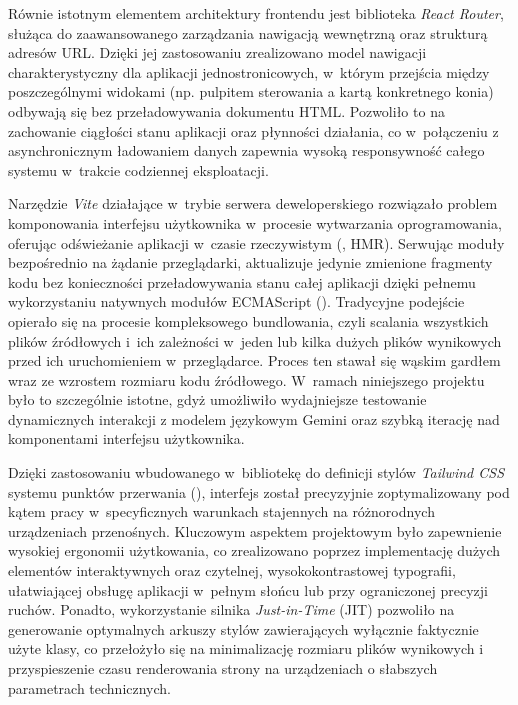 Równie istotnym elementem architektury frontendu jest biblioteka \textit{React Router}, służąca do zaawansowanego zarządzania nawigacją wewnętrzną oraz strukturą adresów URL. Dzięki jej zastosowaniu zrealizowano model nawigacji charakterystyczny dla aplikacji jednostronicowych, w~którym przejścia między poszczególnymi widokami (np. pulpitem sterowania a kartą konkretnego konia) odbywają się bez przeładowywania dokumentu HTML. Pozwoliło to na zachowanie ciągłości stanu aplikacji oraz płynności działania, co w~połączeniu z asynchronicznym ładowaniem danych zapewnia wysoką responsywność całego systemu w~trakcie codziennej eksploatacji.

Narzędzie \textit{Vite} działające w~trybie serwera deweloperskiego rozwiązało problem komponowania interfejsu użytkownika w~procesie wytwarzania oprogramowania, oferując odświeżanie aplikacji w~czasie rzeczywistym (, HMR). Serwując moduły bezpośrednio na żądanie przeglądarki, aktualizuje jedynie zmienione fragmenty kodu bez konieczności przeładowywania stanu całej aplikacji dzięki pełnemu wykorzystaniu natywnych modułów ECMAScript (). Tradycyjne podejście opierało się na procesie kompleksowego bundlowania, czyli scalania wszystkich plików źródłowych i~ich zależności w~jeden lub kilka dużych plików wynikowych przed ich uruchomieniem w~przeglądarce. Proces ten stawał się wąskim gardłem wraz ze wzrostem rozmiaru kodu źródłowego. W~ramach niniejszego projektu było to szczególnie istotne, gdyż umożliwiło wydajniejsze testowanie dynamicznych interakcji z modelem językowym Gemini oraz szybką iterację nad komponentami interfejsu użytkownika.

Dzięki zastosowaniu wbudowanego w~bibliotekę do definicji stylów \textit{Tailwind CSS} systemu punktów przerwania (), interfejs został precyzyjnie zoptymalizowany pod kątem pracy w~specyficznych warunkach stajennych na różnorodnych urządzeniach przenośnych. Kluczowym aspektem projektowym było zapewnienie wysokiej ergonomii użytkowania, co zrealizowano poprzez implementację dużych elementów interaktywnych oraz czytelnej, wysokokontrastowej typografii, ułatwiającej obsługę aplikacji w~pełnym słońcu lub przy ograniczonej precyzji ruchów. Ponadto, wykorzystanie silnika \textit{Just-in-Time} (JIT) pozwoliło na generowanie optymalnych arkuszy stylów zawierających wyłącznie faktycznie użyte klasy, co przełożyło się na minimalizację rozmiaru plików wynikowych i przyspieszenie czasu renderowania strony na urządzeniach o słabszych parametrach technicznych.

